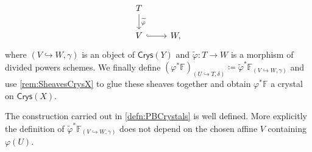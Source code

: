 \begin{defn}
\begin{equation*}
\begin{tikzcd}
		T \arrow[d, "\widetilde{\varphi}", rightarrow] \\
		V \arrow[r, "", hookrightarrow] &
		W
	,\end{tikzcd}
	\end{equation*}
	where $\left(V \hookrightarrow W, \gamma\right)$ is an object of $\mathsf{Crys}(Y)$
	and $\widetilde{\varphi}\colon T \to W$ is a morphism of divided powers schemes.
	We finally define $\left( \varphi^* \mathbb{F} \right)_{\left(U \hookrightarrow T, \delta\right)}
	\coloneqq \widetilde{\varphi}^* \mathbb{F}_{\left(V \hookrightarrow W, \gamma\right)}$
	and use \cref{rem:SheavesCrysX} to glue these sheaves
	together and obtain $\varphi^* \mathbb{F}$ a crystal
	on $\mathsf{Crys}(X)$.
\end{defn}


\begin{prop}[]
	The construction carried out in \cref{defn:PBCrystals} is well defined.
	More explicitly the definition of $\widetilde{\varphi}^* 
	\mathbb{F}_{\left(V \hookrightarrow W, \gamma\right)}$ does not depend
	on the chosen affine $V$ containing $\varphi(U)$.
\end{prop}
